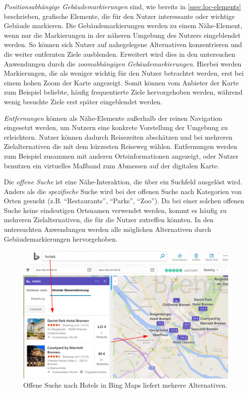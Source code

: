 \emph{Positionsabhängige Gebäudemarkierungen} sind, wie bereits in \autoref{ssec:loc-elements} beschrieben, grafische Elemente, die für den Nutzer interessante oder wichtige Gebäude markieren.
Die Gebäudemarkierungen werden zu einem Nähe-Element, wenn nur die Markierungen in der näheren Umgebung des Nutzers eingeblendet werden.
So können sich Nutzer auf nahegelegene Alternativen konzentrieren und die weiter entfernten Ziele ausblenden.
Erweitert wird dies in den untersuchen Anwendungen durch die \emph{zoomabhängigen Gebäudemarkierungen}.
Hierbei werden Markierungen, die als weniger wichtig für den Nutzer betrachtet werden, erst bei einem hohen Zoom der Karte angezeigt.
Somit können vom Anbieter der Karte zum Beispiel beliebte, häufig frequentierte Ziele hervorgehoben werden, während wenig besuchte Ziele erst später eingeblendet werden.

\emph{Entfernungen} können als Nähe-Elemente außerhalb der reinen Navigation eingesetzt werden, um Nutzern eine konkrete Vorstellung der Umgebung zu erleichtern.
Nutzer können dadurch Reisezeiten abschätzen und bei mehreren Zielalternativen die mit dem kürzesten Reiseweg wählen.
Entfernungen werden zum Beispiel zusammen mit anderen Ortsinformationen angezeigt, oder Nutzer benutzen ein virtuelles Maßband zum Abmessen auf der digitalen Karte.

Die \emph{offene Suche} ist eine Nähe-Interaktion, die über ein Suchfeld ausgelöst wird.
Anders als die \emph{spezifische} Suche wird bei der offenen Suche nach Kategorien von Orten gesucht (z.B. \enquote{Restaurants}, \enquote{Parks}, \enquote{Zoo}).
Da bei einer solchen offenen Suche keine eindeutigen Ortsnamen verwendet werden, kommt es häufig zu mehreren Zielalternativen, die für die Nutzer zutreffen könnten.
In den untersuchten Anwendungen werden alle möglichen Alternativen durch Gebäudemarkierungen hervorgehoben.
\begin{figure}
	\includegraphics[width=\linewidth]{figures/map-app_examples/bm_open_search_2}
	\caption{Offene Suche nach Hotels in Bing Maps liefert mehrere Alternativen.}
	\label{fig:bm_open_search}
\end{figure}

